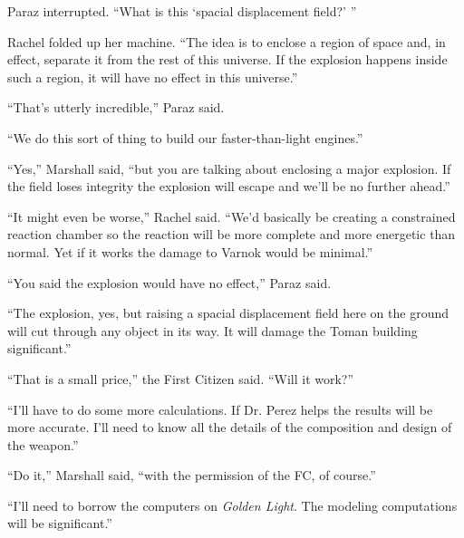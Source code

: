 Paraz interrupted. ``What is this `spacial displacement field?' ''

Rachel folded up her machine. ``The idea is to enclose a region of space and, in effect,
separate it from the rest of this universe. If the explosion happens inside such a region, it
will have no effect in this universe.''

``That's utterly incredible,'' Paraz said.

``We do this sort of thing to build our faster-than-light engines.''

``Yes,'' Marshall said, ``but you are talking about enclosing a major explosion. If the field
loses integrity the explosion will escape and we'll be no further ahead.''

``It might even be worse,'' Rachel said. ``We'd basically be creating a constrained reaction
chamber so the reaction will be more complete and more energetic than normal. Yet if it works
the damage to Varnok would be minimal.''

``You said the explosion would have no effect,'' Paraz said.

``The explosion, yes, but raising a spacial displacement field here on the ground will cut
through any object in its way. It will damage the Toman building significant.''

``That is a small price,'' the First Citizen said. ``Will it work?''

``I'll have to do some more calculations. If Dr. Perez helps the results will be more accurate.
I'll need to know all the details of the composition and design of the weapon.''

``Do it,'' Marshall said, ``with the permission of the FC, of course.''

``I'll need to borrow the computers on \textit{Golden Light}. The modeling computations will be
significant.''

